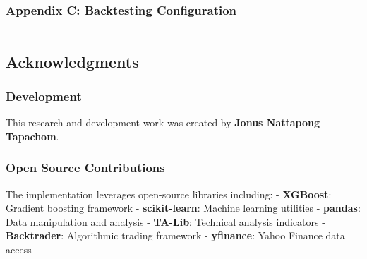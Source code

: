 \subsubsection{Appendix C: Backtesting
Configuration}\label{appendix-c-backtesting-configuration}

\begin{Shaded}
\begin{Highlighting}[]
\OperatorTok{=}\NormalTok{ \{}
    \NormalTok{: }\NormalTok{,}
    \NormalTok{: }\NormalTok{,  }
    \NormalTok{: }\NormalTok{,   }
    \NormalTok{: }\NormalTok{,        }
    \NormalTok{: }\NormalTok{,}
    \NormalTok{: }
\NormalTok{\}}
\end{Highlighting}
\end{Shaded}

\begin{center}\rule{0.5\linewidth}{0.5pt}\end{center}

\subsection{Acknowledgments}\label{acknowledgments}

\subsubsection{Development}\label{development}

This research and development work was created by \textbf{Jonus
Nattapong Tapachom}.

\subsubsection{Open Source
Contributions}\label{open-source-contributions}

The implementation leverages open-source libraries including: -
\textbf{XGBoost}: Gradient boosting framework - \textbf{scikit-learn}:
Machine learning utilities - \textbf{pandas}: Data manipulation and
analysis - \textbf{TA-Lib}: Technical analysis indicators -
\textbf{Backtrader}: Algorithmic trading framework - \textbf{yfinance}:
Yahoo Finance data access


